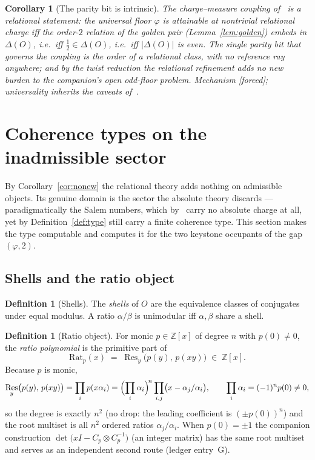 \documentclass[11pt]{article}
\theoremstyle{plain}
\newtheorem{corollary}[theorem]{Corollary}
\theoremstyle{definition}
\newtheorem{definition}[theorem]{Definition}
\theoremstyle{remark}
\newcommand{\Z}{\mathbb{Z}}
\newcommand{\Rat}{\mathrm{Rat}}
\DeclareMathOperator{\Res}{Res}
\newcommand{\F}{\textnormal{[forced]}}
\begin{document}
\begin{corollary}[The parity bit is intrinsic]\label{cor:paritybit}
The charge--measure coupling of~\cite[Thm.~5.1, Cor.~6.3]{CMC} is a relational
statement: the universal floor $\varphi$ is attainable at nontrivial relational
charge iff the order-$2$ relation of the golden pair
(Lemma~\ref{lem:golden}) embeds in $\Delta(O)$, i.e.\ iff $\tfrac12\in\Delta(O)$,
i.e.\ iff $|\Delta(O)|$ is even. The single parity bit that governs the coupling
is the order of a \emph{relational} class, with no reference ray anywhere; and by
the twist reduction the relational refinement adds no new burden to the
companion's open odd-floor problem. Mechanism \F; universality inherits the
caveats of~\cite[Thm.~5.1, Thm.~6.2]{CMC}.
\end{corollary}

\section{Coherence types on the inadmissible sector}\label{sec:inert}

By Corollary~\ref{cor:nonew} the relational theory adds nothing on admissible
objects. Its genuine domain is the sector the absolute theory discards ---
paradigmatically the Salem numbers, which by~\cite[Lem.~6.1]{CMC} carry no
absolute charge at all, yet by Definition~\ref{def:type} still carry a finite
coherence type. This section makes the type computable and computes it for the
two keystone occupants of the gap $(\varphi,2)$.

\subsection{Shells and the ratio object}

\begin{definition}[Shells]
The \emph{shells} of $O$ are the equivalence classes of conjugates under equal
modulus. A ratio $\alpha/\beta$ is unimodular iff $\alpha,\beta$ share a shell.
\end{definition}

\begin{definition}[Ratio object]\label{def:rat}
For monic $p\in\Z[x]$ of degree $n$ with $p(0)\neq0$, the \emph{ratio
polynomial} is the primitive part of
\[
\Rat_p(x)\;=\;\Res_y\bigl(p(y),\,p(xy)\bigr)\;\in\;\Z[x].
\]
Because $p$ is monic,
\[
\Res_y\bigl(p(y),\,p(xy)\bigr)=\prod_{i}p(x\alpha_i)
=\Bigl(\prod_i\alpha_i\Bigr)^{\!n}\prod_{i,j}\bigl(x-\alpha_j/\alpha_i\bigr),
\qquad \prod_i\alpha_i=(-1)^n p(0)\neq0,
\]
so the degree is exactly $n^2$ (no drop: the leading coefficient is
$(\pm p(0))^n$) and the root multiset is all $n^2$ ordered ratios
$\alpha_j/\alpha_i$. When $p(0)=\pm1$ the companion construction
$\det\bigl(xI-C_p\otimes C_p^{-1}\bigr)$ (an integer matrix) has the same root
multiset and serves as an independent second route (ledger entry~G).
\end{definition}
\end{document}
